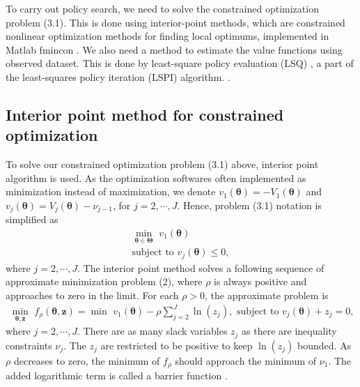 \documentclass{article}
\newcommand{\bs}{ \boldsymbol}
\newcommand{\lt}{\left}
\newcommand{\rt}{\right}
\begin{document}
To carry out policy search, we need to solve the constrained optimization problem (3.1). This is done using interior-point methods, which are constrained nonlinear optimization methods for finding local optimums, implemented in Matlab fmincon \cite{Waltz2006,Byrd1999}.  We also need a method to estimate the value functions using observed dataset. This is done by least-square policy evaluation (LSQ) , a part of the least-squares policy iteration (LSPI) algorithm. \cite{Lagoudakis2003,Lagoudakis2001}. 

\subsection{Interior point method for constrained optimization}
To solve our constrained optimization problem (3.1) above, interior point algorithm is used. As the optimization softwares often implemented as minimization instead of maximization, we denote $v_1(\bs{\theta}) = - V_1\lt({\bs{\theta}}\rt)$ and  $v_j(\bs{\theta}) = V_j(\bs{\theta}) - \nu_{j-1}$, for $j = 2, \cdots, J$. Hence,  problem (3.1) notation is simplified as
\begin{equation}
\begin{gathered}
\min_{\bs{\theta} \in \bs{\Theta}}  \,\, v_1(\bs{\theta}) \\ 
\text{subject to}  \,\, v_j(\bs{\theta}) \le 0,
\end{gathered}
\end{equation}
where  $j = 2, \cdots, J$.
The interior point method solves a following sequence of approximate minimization problem (2), where $\rho$ is always positive and approaches to zero in the limit. For each $\rho >0$, the approximate problem is 
\begin{equation}
\begin{gathered}
\min_{\bs{\theta}, \bs{z}} \,\, f_{\rho}(\bs{\theta}, \bs{z}) = \min \,\,v_1(\bs{\theta}) - \rho \sum_{j=2}^J \ln(z_j), \text{ subject to } v_j(\bs{\theta})  + z_j = 0,
\end{gathered}
\end{equation}
where $j = 2, \cdots, J$. There are as many slack variables $z_j$ as there are inequality constraints $\nu_j$. The $z_j$ are restricted to be positive to keep $\ln(z_j)$ bounded. As $\rho$ decreases to zero, the minimum of $f_\rho$ should approach the minimum of $\nu_1$. The added logarithmic term is called a barrier function \cite{Waltz2006,Byrd1999}.
\end{document}
